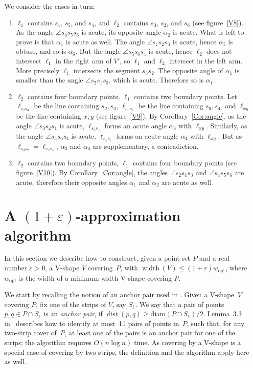 \documentclass{llncs}
\newcommand{\wopt}{w_{\mathrm{opt}}}
\let\eps\varepsilon
\DeclareMathOperator{\dist}{dist}
\DeclareMathOperator{\width}{width}
\begin{document}
We consider the cases in turn:
\begin{enumerate} \itemsep 0pt \parsep 0pt \parskip 0pt
\item $\ell_1$ contains $s_1$, $s_5$, and $s_4$, and $\ell_2$ contains
  $s_3$, $s_2$, and $s_6$
(see figure~\ref{V8}).
As the angle $\angle s_4 s_5 s_6$ is acute, its opposite angle $\alpha_2$ is acute. 
What is left to prove is that $\alpha_1$ is acute as well.
The angle $\angle s_1 s_2 s_3$ is acute, hence $\alpha_5$ is obtuse,
and so is $\alpha_6$.
But the angle $\angle s_5 s_6 s_4$ is acute, hence $\ell_2$ does not intersect $\ell_1$ in the right arm of $V'$, so $\ell_1$ and $\ell_2$ intersect in the left arm.
More precisely $\ell_1$ intersects the segment $s_3 s_2$.
The opposite angle of $\alpha_1$ is smaller than the angle $\angle s_2 s_1 s_3$, which is acute.
Therefore so is $\alpha_1$.
\item $\ell_2$ contains four boundary points, $\ell_1$ contains two boundary points.
Let $\ell_{s_2 s_3}$ be the line containing $s_2, s_3$, $\ell_{s_6 s_4}$ be the line containing $s_6,s_4$, and $\ell_{xy}$ be the line containing $x,y$ (see figure~\ref{V9}).
By Corollary~\ref{Cor:angle}, as the angle $\angle s_3 s_2 s_1$ is acute, $\ell_{s_2 s_3}$ forms an acute angle $\alpha_3$ with $\ell_{xy}$.
Similarly, as the angle $\angle s_5 s_6 s_4$ is acute, $\ell_{s_6 s_4}$ forms an acute angle $\alpha_4$ with $\ell_{xy}$.
But as $\ell_{s_3 s_2} = \ell_{s_6 s_4}$, $\alpha_3$ and $\alpha_4$ are supplementary, a contradiction.
\item $\ell_2$ contains two boundary points, $\ell_1$ contains four boundary points (see figure~\ref{V10}).
By Corollary~\ref{Cor:angle}, the angles $\angle s_2 s_1 s_3$ and $\angle s_4 s_5 s_6$ are acute, therefore their opposite angles $\alpha_1$ and $\alpha_2$ are acute as well.
\end{enumerate}





\section{A $(1+\eps)$-approximation algorithm}
\label{sec:one+eps}

In this section we describe how to construct, given a point set $P$
and a real number $\eps>0$, a V-shape $V$ covering~$P$, with
$\width(V)\leq(1+\eps)\wopt$, where $\wopt$ is the width of a
minimum-width V-shape covering $P$.

We start by recalling the notion of an anchor pair used in
\cite{2-line-center}.  Given a V-shape~$V$ covering $P$, fix one of
the strips of $V$, say $S_1$.  We say that a pair of points $p,q \in P
\cap S_1$ is an \emph{anchor pair}, if $\dist(p,q) \geq \mathrm{diam}(P \cap
S_1)/2$.  Lemma~3.3 in~\cite{2-line-center} describes how to identify
at most~11 pairs of points in~$P$, such that, for any two-strip cover
of~$P$, at least one of the pairs is an anchor pair for one of the
strips; the algorithm requires $O(n \log n)$ time.  As covering by a
V-shape is a special case of covering by two strips, the definition
and the algorithm apply here as well.
\end{document}
